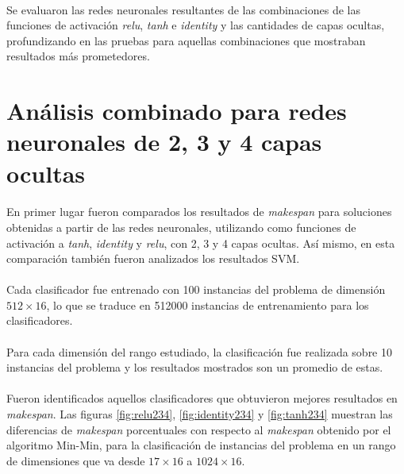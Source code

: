 \paragraph{}  Se evaluaron las redes neuronales resultantes de las combinaciones de las funciones de activación \textit{relu}, \textit{tanh} e \textit{identity} y las cantidades de capas ocultas, profundizando en las pruebas para aquellas combinaciones que mostraban resultados más prometedores.

\section{Análisis combinado para redes neuronales de 2, 3 y 4 capas ocultas}

\paragraph{}En primer lugar fueron comparados los resultados de \textit{makespan} para soluciones obtenidas a partir de las redes neuronales, utilizando como funciones de activación a \textit{tanh}, \textit{identity} y \textit{relu}, con 2, 3 y 4 capas ocultas.
Así mismo, en esta comparación también fueron analizados los resultados SVM. 

\paragraph{} Cada clasificador fue entrenado con 100 instancias del problema de dimensión $512\times16$, lo que se traduce en 512000 instancias de entrenamiento para los clasificadores. 

\paragraph{} Para cada dimensión del rango estudiado, la clasificación fue realizada sobre 10 instancias del problema y los resultados mostrados son un promedio de estas.

\paragraph{} Fueron identificados aquellos clasificadores que obtuvieron mejores resultados en \textit{makespan}.
Las figuras \ref{fig:relu234}, \ref{fig:identity234} y \ref{fig:tanh234} muestran las diferencias de \textit{makespan} porcentuales con respecto al \textit{makespan} obtenido por el algoritmo Min-Min, para la clasificación de instancias del problema en un rango de dimensiones que va desde $17\times16$ a $1024\times16$.

